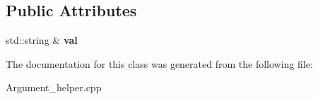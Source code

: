 \subsection*{Public Attributes}
\begin{DoxyCompactItemize}
\item 
\hypertarget{classdsr_1_1_argument__helper_1_1_string_target_a07497eff5e99993cf79865284610c6e1}{
std::string \& {\bfseries val}}
\label{classdsr_1_1_argument__helper_1_1_string_target_a07497eff5e99993cf79865284610c6e1}

\end{DoxyCompactItemize}


The documentation for this class was generated from the following file:\begin{DoxyCompactItemize}
\item 
Argument\_\-helper.cpp\end{DoxyCompactItemize}
